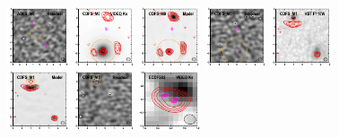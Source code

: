 \documentclass[iop]{emulateapj}
\begin{document}
\begin{figure}[!tbp]
\begin{centering}
\includegraphics[width=0.162\textwidth]{../Figures/modelfit/ADFS_M0_residual_bestfit.pdf}
\includegraphics[width=0.162\textwidth]{../Figures/modelfit/CDFS_M0_optical_bestfit.pdf}
\includegraphics[width=0.162\textwidth]{../Figures/modelfit/CDFS_M0_model_bestfit.pdf}
\includegraphics[width=0.162\textwidth]{../Figures/modelfit/CDFS_M0_residual_bestfit.pdf}
\includegraphics[width=0.162\textwidth]{../Figures/modelfit/CDFS_M1_optical_bestfit.pdf}
\includegraphics[width=0.162\textwidth]{../Figures/modelfit/CDFS_M1_model_bestfit.pdf}
\includegraphics[width=0.162\textwidth]{../Figures/modelfit/CDFS_M1_residual_bestfit.pdf}
\includegraphics[width=0.162\textwidth]{../Figures/modelfit/ECDFS02_optical_bestfit.pdf}

\end{centering}
\end{figure}
\end{document}
